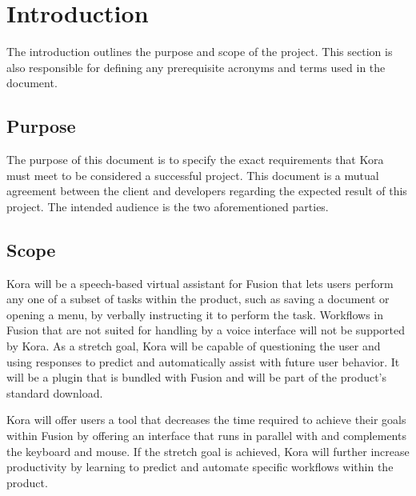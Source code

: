 \documentclass[onecolumn, draftclsnofoot,10pt, compsoc]{IEEEtran}
\def \botname{Kora\xspace}
\begin{document}
\section{Introduction}
        The introduction outlines the purpose and scope of the project. 
        This section is also responsible for defining any prerequisite acronyms and terms used in the document. 
    \subsection{Purpose}
        The purpose of this document is to specify the exact requirements that \botname must meet to be considered a successful project. 
        This document is a mutual agreement between the client and developers regarding the expected result of this project.
        The intended audience is the two aforementioned parties.
    \subsection{Scope}
        \botname will be a speech-based virtual assistant for Fusion that lets users perform any one of a subset of tasks within the product, such as saving a document or opening a menu, by verbally instructing it to perform the task.
        Workflows in Fusion that are not suited for handling by a voice interface will not be supported by \botname.
        As a stretch goal, \botname will be capable of questioning the user and using responses to predict and automatically assist with future user behavior.
        It will be a plugin that is bundled with Fusion and will be part of the product's standard download. 

        \botname will offer users a tool that decreases the time required to achieve their goals within Fusion by offering an interface that runs in parallel with and complements the keyboard and mouse.
        If the stretch goal is achieved, \botname will further increase productivity by learning to predict and automate specific workflows within the product.
        
\end{document}
